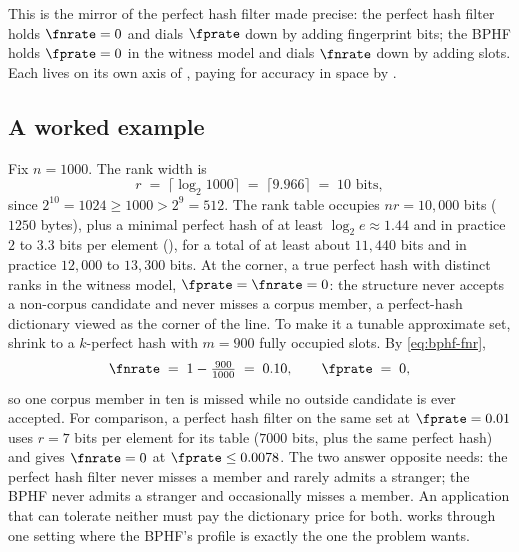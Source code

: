 This is the mirror of the perfect hash filter made precise: the perfect
hash filter holds $\fnrate = 0$ and dials $\fprate$ down by adding
fingerprint bits; the BPHF holds $\fprate = 0$ in the witness model and
dials $\fnrate$ down by adding slots. Each lives on its own axis of
, paying for accuracy in space by
.

\subsection*{A worked example}

Fix $n = 1000$. The rank width is
\[
  r \;=\; \lceil \log_2 1000 \rceil \;=\; \lceil 9.966 \rceil \;=\; 10
  \text{ bits},
\]
since $2^{10} = 1024 \ge 1000 > 2^9 = 512$. The rank table occupies
$n r = 10{,}000$ bits ($1250$ bytes), plus a minimal perfect hash of at
least $\log_2 e \approx 1.44$ and in practice $2$ to $3.3$ bits per
element (), for a total of at least about $11{,}440$
bits and in practice $12{,}000$ to $13{,}300$ bits. At the corner, a true perfect hash with distinct ranks
in the witness model, $\fprate = \fnrate = 0$: the structure never
accepts a non-corpus candidate and never misses a corpus member, a
perfect-hash dictionary viewed as the corner of the line. To make it a
tunable approximate set, shrink to a $k$-perfect hash with $m = 900$
fully occupied slots. By \eqref{eq:bphf-fnr},
\[
  \fnrate \;=\; 1 - \tfrac{900}{1000} \;=\; 0.10,
  \qquad
  \fprate \;=\; 0,
\]
so one corpus member in ten is missed while no outside candidate is ever
accepted. For comparison, a perfect hash filter on the same set at
$\fprate = 0.01$ uses $r = 7$ bits per element for its table ($7000$
bits, plus the same perfect hash) and gives $\fnrate = 0$ at $\fprate
\le 0.0078$. The two answer opposite needs: the perfect hash filter never
misses a member and rarely admits a stranger; the BPHF never admits a
stranger and occasionally misses a member. An application that can
tolerate neither must pay the dictionary price for both.
 works through one setting where the BPHF's
profile is exactly the one the problem wants.
